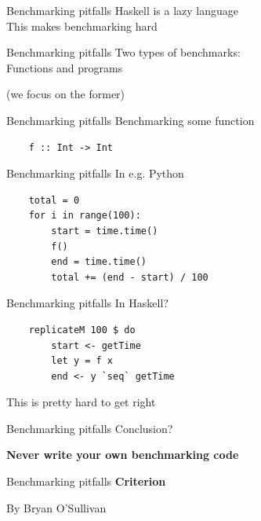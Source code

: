 \documentclass[20pt]{beamer}
\newcommand{\vspaced}{
    \vspace{5mm}
}
\begin{document}


\begin{frame}{Benchmarking pitfalls}
    Haskell is a lazy language \\
    This makes benchmarking hard
\end{frame}

\begin{frame}{Benchmarking pitfalls}
    Two types of benchmarks: \\
    Functions and programs \\
    \vspaced
    (we focus on the former)
\end{frame}

\begin{frame}[fragile]{Benchmarking pitfalls}
    Benchmarking some function

    \begin{lstlisting}
    f :: Int -> Int
    \end{lstlisting}
\end{frame}

\begin{frame}[fragile]{Benchmarking pitfalls}
    In e.g. Python
    \vspaced
    \begin{lstlisting}
    total = 0
    for i in range(100):
        start = time.time()
        f()
        end = time.time()
        total += (end - start) / 100
    \end{lstlisting}
\end{frame}

\begin{frame}[fragile]{Benchmarking pitfalls}
    In Haskell?
    \vspaced
    \begin{lstlisting}
    replicateM 100 $ do
        start <- getTime
        let y = f x
        end <- y `seq` getTime
    \end{lstlisting}
    \vspaced
    This is pretty hard to get right
\end{frame}

\begin{frame}{Benchmarking pitfalls}
    Conclusion? \\
    \vspaced
    \textbf{Never write your own benchmarking code}
\end{frame}

\begin{frame}{Benchmarking pitfalls}
    \textbf{Criterion} \\
    \vspaced
    By Bryan O'Sullivan
\end{frame}
\end{document}
